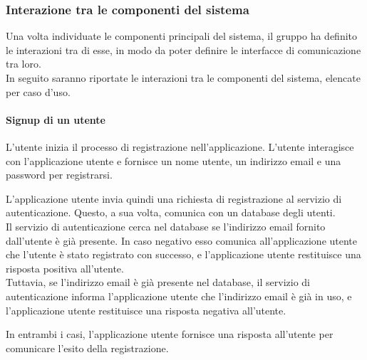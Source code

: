 \subsubsection{Interazione tra le componenti del sistema}
Una volta individuate le componenti principali del sistema, il gruppo ha definito le
interazioni tra di esse, in modo da poter definire le interfacce di comunicazione tra loro.\\
In seguito saranno riportate le interazioni tra le componenti del sistema, elencate per caso d'uso.\\

\paragraph{Signup di un utente}
L'utente inizia il processo di registrazione nell'applicazione. L'utente interagisce con
l'applicazione utente e fornisce un nome utente, un indirizzo email e una password per registrarsi.

L'applicazione utente invia quindi una richiesta di registrazione al servizio di autenticazione.
Questo, a sua volta, comunica con un database degli utenti.\\

Il servizio di autenticazione cerca nel database se l'indirizzo email fornito dall'utente è
già presente. In caso negativo esso comunica all'applicazione utente che l'utente è stato registrato
con successo, e l'applicazione utente restituisce una risposta positiva all'utente.\\

Tuttavia, se l'indirizzo email è già presente nel database, il servizio di autenticazione informa
l'applicazione utente che l'indirizzo email è già in uso, e l'applicazione utente restituisce una
risposta negativa all'utente.

In entrambi i casi, l'applicazione utente fornisce una risposta all'utente per comunicare l'esito
della registrazione.\\

